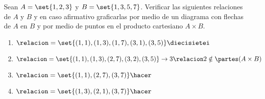 \ejercicio Sean $A = \set{1, 2, 3}$ y $B = \set{1, 3, 5, 7}$. Verificar las siguientes
relaciones de $A$ y $B$ y en caso afirmativo graficarlas por medio de un diagrama
con flechas de $A$ en $B$ y por medio de puntos en el producto cartesiano $A \times B$.

\begin{multicols}{2}
	\begin{enumerate}[label=\roman*)]
		\item $\relacion = \set{(1,1), (1,3), (1,7), (3,1), (3,5)}\\
			      \diecisietei $

		\item $\relacion = \set{(1,1), (1,3), (2,7), (3,2), (3,5)}\\
			      \to 3 \relacion 2 \notin \partes(A \times B) $

		\item $\relacion = \set{(1,1), (2,7), (3,7)}\hacer$

		\item $\relacion = \set{(1,3), (2,1), (3,7)}\hacer$
	\end{enumerate}
\end{multicols}
